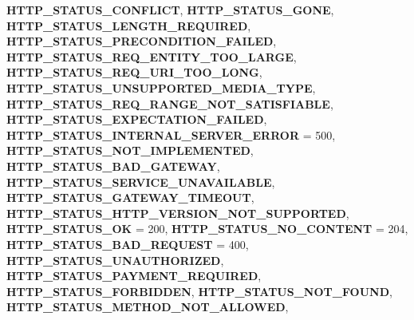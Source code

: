 \begin{DoxyCompactItemize}
{\bfseries H\+T\+T\+P\+\_\+\+S\+T\+A\+T\+U\+S\+\_\+\+C\+O\+N\+F\+L\+I\+CT}, 
\newline
{\bfseries H\+T\+T\+P\+\_\+\+S\+T\+A\+T\+U\+S\+\_\+\+G\+O\+NE}, 
{\bfseries H\+T\+T\+P\+\_\+\+S\+T\+A\+T\+U\+S\+\_\+\+L\+E\+N\+G\+T\+H\+\_\+\+R\+E\+Q\+U\+I\+R\+ED}, 
{\bfseries H\+T\+T\+P\+\_\+\+S\+T\+A\+T\+U\+S\+\_\+\+P\+R\+E\+C\+O\+N\+D\+I\+T\+I\+O\+N\+\_\+\+F\+A\+I\+L\+ED}, 
{\bfseries H\+T\+T\+P\+\_\+\+S\+T\+A\+T\+U\+S\+\_\+\+R\+E\+Q\+\_\+\+E\+N\+T\+I\+T\+Y\+\_\+\+T\+O\+O\+\_\+\+L\+A\+R\+GE}, 
\newline
{\bfseries H\+T\+T\+P\+\_\+\+S\+T\+A\+T\+U\+S\+\_\+\+R\+E\+Q\+\_\+\+U\+R\+I\+\_\+\+T\+O\+O\+\_\+\+L\+O\+NG}, 
{\bfseries H\+T\+T\+P\+\_\+\+S\+T\+A\+T\+U\+S\+\_\+\+U\+N\+S\+U\+P\+P\+O\+R\+T\+E\+D\+\_\+\+M\+E\+D\+I\+A\+\_\+\+T\+Y\+PE}, 
{\bfseries H\+T\+T\+P\+\_\+\+S\+T\+A\+T\+U\+S\+\_\+\+R\+E\+Q\+\_\+\+R\+A\+N\+G\+E\+\_\+\+N\+O\+T\+\_\+\+S\+A\+T\+I\+S\+F\+I\+A\+B\+LE}, 
{\bfseries H\+T\+T\+P\+\_\+\+S\+T\+A\+T\+U\+S\+\_\+\+E\+X\+P\+E\+C\+T\+A\+T\+I\+O\+N\+\_\+\+F\+A\+I\+L\+ED}, 
\newline
{\bfseries H\+T\+T\+P\+\_\+\+S\+T\+A\+T\+U\+S\+\_\+\+I\+N\+T\+E\+R\+N\+A\+L\+\_\+\+S\+E\+R\+V\+E\+R\+\_\+\+E\+R\+R\+OR} = 500, 
{\bfseries H\+T\+T\+P\+\_\+\+S\+T\+A\+T\+U\+S\+\_\+\+N\+O\+T\+\_\+\+I\+M\+P\+L\+E\+M\+E\+N\+T\+ED}, 
{\bfseries H\+T\+T\+P\+\_\+\+S\+T\+A\+T\+U\+S\+\_\+\+B\+A\+D\+\_\+\+G\+A\+T\+E\+W\+AY}, 
{\bfseries H\+T\+T\+P\+\_\+\+S\+T\+A\+T\+U\+S\+\_\+\+S\+E\+R\+V\+I\+C\+E\+\_\+\+U\+N\+A\+V\+A\+I\+L\+A\+B\+LE}, 
\newline
{\bfseries H\+T\+T\+P\+\_\+\+S\+T\+A\+T\+U\+S\+\_\+\+G\+A\+T\+E\+W\+A\+Y\+\_\+\+T\+I\+M\+E\+O\+UT}, 
{\bfseries H\+T\+T\+P\+\_\+\+S\+T\+A\+T\+U\+S\+\_\+\+H\+T\+T\+P\+\_\+\+V\+E\+R\+S\+I\+O\+N\+\_\+\+N\+O\+T\+\_\+\+S\+U\+P\+P\+O\+R\+T\+ED}, 
{\bfseries H\+T\+T\+P\+\_\+\+S\+T\+A\+T\+U\+S\+\_\+\+OK} = 200, 
{\bfseries H\+T\+T\+P\+\_\+\+S\+T\+A\+T\+U\+S\+\_\+\+N\+O\+\_\+\+C\+O\+N\+T\+E\+NT} = 204, 
\newline
{\bfseries H\+T\+T\+P\+\_\+\+S\+T\+A\+T\+U\+S\+\_\+\+B\+A\+D\+\_\+\+R\+E\+Q\+U\+E\+ST} = 400, 
{\bfseries H\+T\+T\+P\+\_\+\+S\+T\+A\+T\+U\+S\+\_\+\+U\+N\+A\+U\+T\+H\+O\+R\+I\+Z\+ED}, 
{\bfseries H\+T\+T\+P\+\_\+\+S\+T\+A\+T\+U\+S\+\_\+\+P\+A\+Y\+M\+E\+N\+T\+\_\+\+R\+E\+Q\+U\+I\+R\+ED}, 
{\bfseries H\+T\+T\+P\+\_\+\+S\+T\+A\+T\+U\+S\+\_\+\+F\+O\+R\+B\+I\+D\+D\+EN}, 
\newline
{\bfseries H\+T\+T\+P\+\_\+\+S\+T\+A\+T\+U\+S\+\_\+\+N\+O\+T\+\_\+\+F\+O\+U\+ND}, 
{\bfseries H\+T\+T\+P\+\_\+\+S\+T\+A\+T\+U\+S\+\_\+\+M\+E\+T\+H\+O\+D\+\_\+\+N\+O\+T\+\_\+\+A\+L\+L\+O\+W\+ED}, 

\end{DoxyCompactItemize}
